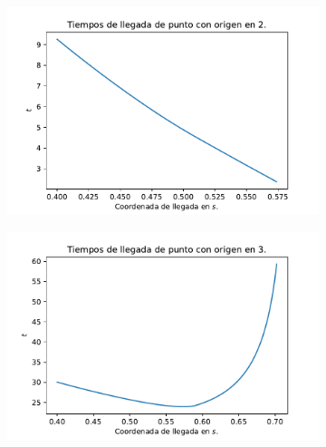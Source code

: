\documentclass{article}
\begin{document}
\begin{figure}
\centering
\begin{subfigure}{0.5\textwidth}
	\includegraphics[width = \textwidth]{tiempos_2.pdf}
	\caption{}
	\label{subfig:2}
\end{subfigure}%
\begin{subfigure}{0.5\textwidth}
	\includegraphics[width = \textwidth]{tiempos_3.pdf}
	\caption{}
	\label{subfig:3}
\end{subfigure}


\end{figure}
\end{document}
